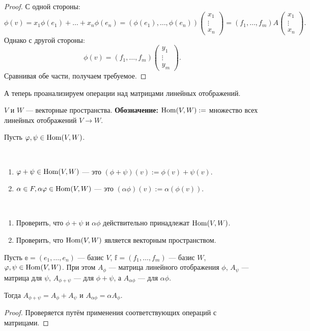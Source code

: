 \begin{proof}
С одной стороны:
\[
\phi(v) = x_1 \phi(e_1) + \ldots + x_n\phi(e_n) = (\phi(e_1), \ldots, \phi(e_n))\begin{pmatrix*}x_1 \\ \vdots \\ x_n\end{pmatrix*} = (f_1, \ldots, f_m)A\begin{pmatrix*}x_1 \\ \vdots \\ x_n\end{pmatrix*}.
\]
Однако с другой стороны:
\[
\phi(v) = (f_1, \ldots, f_m)\begin{pmatrix*}y_1 \\ \vdots \\ y_m\end{pmatrix*}.
\]
Сравнивая обе части, получаем требуемое.
\end{proof}

А теперь проанализируем операции над матрицами линейных отображений.

$V$ и $W$ --- векторные пространства. \textbf{Обозначение:} $\mathrm{Hom}(V, W):=$ множество всех линейных отображений $V \rightarrow W$.

Пусть $\varphi, \psi \in \mathrm{Hom}(V, W)$.

\begin{Def}\ 
\begin{enumerate}
\item $\varphi + \psi \in \mathrm{Hom}(V, W)$ --- это $(\phi + \psi)(v):= \phi(v) + \psi(v)$.
\item $\alpha \in F, \alpha\varphi \in \mathrm{Hom}(V, W)$ --- это $(\alpha\phi)(v) := \alpha(\phi(v))$.
\end{enumerate}
\end{Def}

\begin{Task}\
\begin{enumerate}
\item Проверить, что $\phi + \psi$ и $\alpha\phi$ действительно принадлежат $\mathrm{Hom}(V, W)$.
\item Проверить, что $\mathrm{Hom}(V, W)$ является векторным пространством.
\end{enumerate}
\end{Task}

\begin{Suggestion}
Пусть $\mathbb{e} = (e_1, \ldots, e_n)$ --- базис $V$, $\mathbb{f} = (f_1, \ldots, f_m)$ --- базис $W$, $\varphi, \psi \in \mathrm{Hom}(V, W)$. При этом $A_{\phi}$ --- матрица линейного отображения $\phi$, $A_{\psi}$ --- матрица для $\psi$, $A_{\phi+\psi}$ --- для $\phi + \psi$, а $A_{\alpha\phi}$ --- для $\alpha\phi$.

Тогда $A_{\phi+\psi} = A_{\phi} + A_{\psi}$ и $A_{\alpha\phi} = \alpha A_{\phi}$.
\end{Suggestion}
\begin{proof}
    Проверяется путём применения соответствующих операций с матрицами.
\end{proof}

